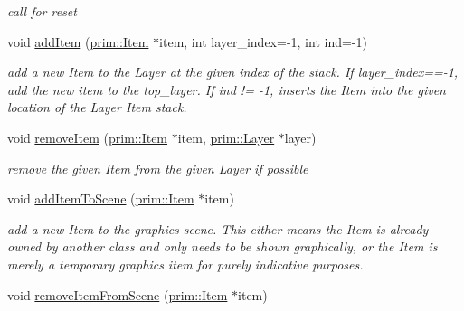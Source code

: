 \begin{DoxyCompactItemize}
\begin{DoxyCompactList}\small\item\em call for reset \end{DoxyCompactList}\item 
void \hyperlink{classgui_1_1DesignPanel_a3b4be7aea300f2c35e669b06b5e6bf7e}{add\+Item} (\hyperlink{classprim_1_1Item}{prim\+::\+Item} $\ast$item, int layer\+\_\+index=-\/1, int ind=-\/1)\hypertarget{classgui_1_1DesignPanel_a3b4be7aea300f2c35e669b06b5e6bf7e}{}\label{classgui_1_1DesignPanel_a3b4be7aea300f2c35e669b06b5e6bf7e}

\begin{DoxyCompactList}\small\item\em add a new Item to the Layer at the given index of the stack. If layer\+\_\+index==-\/1, add the new item to the top\+\_\+layer. If ind != -\/1, inserts the Item into the given location of the Layer Item stack. \end{DoxyCompactList}\item 
void \hyperlink{classgui_1_1DesignPanel_adc08e2f6ccfa31115abd910ddd84cde8}{remove\+Item} (\hyperlink{classprim_1_1Item}{prim\+::\+Item} $\ast$item, \hyperlink{classprim_1_1Layer}{prim\+::\+Layer} $\ast$layer)\hypertarget{classgui_1_1DesignPanel_adc08e2f6ccfa31115abd910ddd84cde8}{}\label{classgui_1_1DesignPanel_adc08e2f6ccfa31115abd910ddd84cde8}

\begin{DoxyCompactList}\small\item\em remove the given Item from the given Layer if possible \end{DoxyCompactList}\item 
void \hyperlink{classgui_1_1DesignPanel_ac75a90e1243137b700991ddc17a05897}{add\+Item\+To\+Scene} (\hyperlink{classprim_1_1Item}{prim\+::\+Item} $\ast$item)\hypertarget{classgui_1_1DesignPanel_ac75a90e1243137b700991ddc17a05897}{}\label{classgui_1_1DesignPanel_ac75a90e1243137b700991ddc17a05897}

\begin{DoxyCompactList}\small\item\em add a new Item to the graphics scene. This either means the Item is already owned by another class and only needs to be shown graphically, or the Item is merely a temporary graphics item for purely indicative purposes. \end{DoxyCompactList}\item 
void \hyperlink{classgui_1_1DesignPanel_a00f56619598159824291e1de961582c0}{remove\+Item\+From\+Scene} (\hyperlink{classprim_1_1Item}{prim\+::\+Item} $\ast$item)\hypertarget{classgui_1_1DesignPanel_a00f56619598159824291e1de961582c0}{}\label{classgui_1_1DesignPanel_a00f56619598159824291e1de961582c0}


\end{DoxyCompactItemize}
